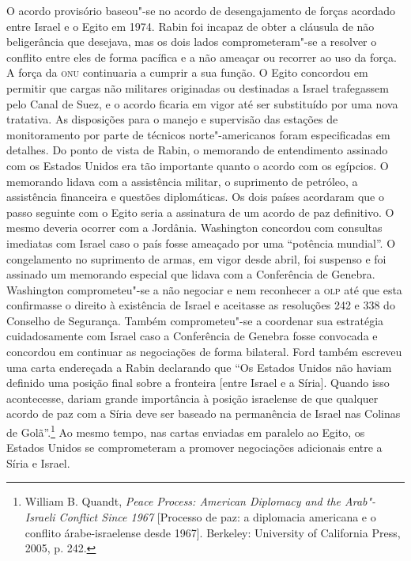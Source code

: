 O acordo provisório baseou"-se no acordo de desengajamento de forças
acordado entre Israel e o Egito em 1974. Rabin foi incapaz de obter a
cláusula de não beligerância que desejava, mas os dois lados
comprometeram"-se a resolver o conflito entre eles de forma pacífica e a
não ameaçar ou recorrer ao uso da força. A força da \textsc{onu} continuaria a
cumprir a sua função. O Egito concordou em permitir que cargas
não militares originadas ou destinadas a Israel trafegassem pelo Canal
de Suez, e o acordo ficaria em vigor até ser substituído por uma nova
tratativa. As disposições para o manejo e supervisão das estações de
monitoramento por parte de técnicos norte"-americanos foram especificadas
em detalhes. Do ponto de vista de Rabin, o memorando de entendimento
assinado com os Estados Unidos era tão importante quanto o acordo com os
egípcios. O memorando lidava com a assistência militar, o suprimento de
petróleo, a assistência financeira e questões diplomáticas. Os dois
países acordaram que o passo seguinte com o Egito seria a assinatura de
um acordo de paz definitivo. O mesmo deveria ocorrer com a Jordânia.
Washington concordou com consultas imediatas com Israel caso o país
fosse ameaçado por uma ``potência mundial''. O congelamento no
suprimento de armas, em vigor desde abril, foi suspenso e foi assinado
um memorando especial que lidava com a Conferência de Genebra.
Washington comprometeu"-se a não negociar e nem reconhecer a \textsc{olp} até que
esta confirmasse o direito à existência de Israel e aceitasse as
resoluções 242 e 338 do Conselho de Segurança. Também comprometeu"-se a
coordenar sua estratégia cuidadosamente com Israel caso a Conferência de
Genebra fosse convocada e concordou em continuar as negociações de forma
bilateral. Ford também escreveu uma carta endereçada a Rabin declarando
que ``Os Estados Unidos não haviam definido uma posição final sobre a
fronteira {[}entre Israel e a Síria{]}. Quando isso acontecesse, dariam grande
importância à posição israelense de que qualquer acordo de paz com a
Síria deve ser baseado na permanência de Israel nas Colinas de
Golã''.\footnote{William B. Quandt, \emph{Peace Process: American Diplomacy and the
Arab"-Israeli Conflict Since 1967} {[}Processo de paz: a diplomacia americana e o conflito árabe-israelense desde 1967{]}. Berkeley: University of California
Press, 2005, p. 242.} Ao mesmo tempo, nas cartas enviadas em paralelo ao
Egito, os Estados Unidos se comprometeram a promover negociações
adicionais entre a Síria e Israel.

